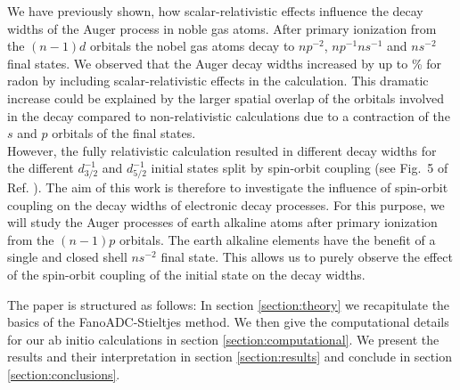 We have previously shown, how
scalar-relativistic effects influence the decay widths of the Auger process in
noble gas atoms. After primary ionization from the $(n-1)d$ orbitals the nobel
gas atoms decay to $np^{-2}$, $np^{-1}ns^{-1}$ and $ns^{-2}$ final states.
We observed that the Auger decay widths increased by up to \unit[326]{\%}
for radon
by including scalar-relativistic effects in the calculation. This
dramatic increase could be explained by the larger spatial
overlap of the orbitals
involved in the decay compared to non-relativistic calculations due to
a contraction of the $s$ and $p$ orbitals of the final states.\\
However, the fully relativistic calculation resulted in different decay widths
for the different $d_{3/2}^{-1}$ and $d_{5/2}^{-1}$ initial states split by
spin-orbit coupling (see Fig.~5 of Ref. \cite{Fasshauer15_1}).
The aim of this work is therefore to investigate the
influence of spin-orbit coupling on the decay widths of electronic decay processes.
For this purpose, we will study the Auger processes of earth alkaline atoms
after primary ionization from the $(n-1)p$ orbitals. The earth alkaline elements
have the benefit of a single and closed shell $ns^{-2}$ final state.
This allows us to purely observe the effect of the spin-orbit coupling of the
initial state on the decay widths.

The paper is structured as follows:
In section \ref{section:theory} we recapitulate the basics of the
FanoADC-Stieltjes method. We then give the computational details for our
ab initio calculations in section \ref{section:computational}. We present the
results and their interpretation in section \ref{section:results}
and conclude in section \ref{section:conclusions}.
